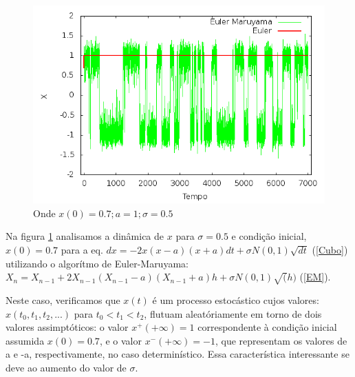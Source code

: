 \begin{figure}[!htb]
\centering
\begin{minipage}[b]{0.55\linewidth}
\includegraphics[width=\linewidth]{./img/Langevin_CI07_ruido05.png}
\caption{Onde $x(0) = 0.7 ; a = 1 ; \sigma = 0.5$}
\label{fig3}
\end{minipage} \hfill
\end{figure}

Na figura \ref{fig3} analisamos a dinâmica de $x$ para $\sigma = 0.5$ e condição inicial, $x(0) = 0.7$ para a eq. 
${dx} = -2x(x-a)(x+a)dt + \sigma N(0,1) \sqrt{dt}$ (\ref{Cubo}) utilizando o algorítmo de Euler-Maruyama: 
$X_n = X_{n-1} + 2X_{n-1}(X_{n-1} - a)(X_{n-1} + a)h + \sigma N(0,1) \sqrt(h)$ (\ref{EM}).

Neste caso, verificamos que $x(t)$ é um processo estocástico cujos valores: $x(t_{0}, t_{1}, t_{2},...)$ para 
$t_{0} < t_{1} < t_{2}$, flutuam aleatóriamente em torno de dois valores assimptóticos: o valor  $x^{+}(+\infty) = 1$ correspondente à condição inicial assumida $x(0) = 0.7$, e o valor $x^{-}(+\infty) = -1$, que representam os valores de a e -a, respectivamente, no caso determinístico. Essa característica interessante se deve ao aumento do valor de $\sigma$.

